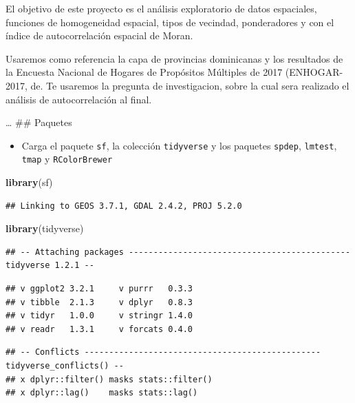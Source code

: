 \documentclass[11pt,]{article}
\newenvironment{Shaded}{\begin{snugshade}}{\end{snugshade}}
\newcommand{\KeywordTok}[1]{\textcolor[rgb]{0.13,0.29,0.53}{\textbf{#1}}}
\newcommand{\NormalTok}[1]{#1}
\providecommand{\tightlist}{%
\setlength{\itemsep}{0pt}\setlength{\parskip}{0pt}}
\begin{document}
El objetivo de este proyecto es el análisis exploratorio de datos
espaciales, funciones de homogeneidad espacial, tipos de vecindad,
ponderadores y con el índice de autocorrelación espacial de Moran.

Usaremos como referencia la capa de provincias dominicanas y los
resultados de la Encuesta Nacional de Hogares de Propósitos Múltiples de
2017 (ENHOGAR-2017, de. Te usaremos la pregunta de investigacion, sobre
la cual sera realizado el análisis de autocorrelación al final.

\ldots
\#\# Paquetes

\begin{itemize}
\tightlist
\item
  Carga el paquete \texttt{sf}, la colección \texttt{tidyverse} y los
  paquetes \texttt{spdep}, \texttt{lmtest}, \texttt{tmap} y
  \texttt{RColorBrewer}
\end{itemize}

\begin{Shaded}
\begin{Highlighting}[]
\KeywordTok{library}\NormalTok{(sf)}
\end{Highlighting}
\end{Shaded}

\begin{verbatim}
## Linking to GEOS 3.7.1, GDAL 2.4.2, PROJ 5.2.0
\end{verbatim}

\begin{Shaded}
\begin{Highlighting}[]
\KeywordTok{library}\NormalTok{(tidyverse)}
\end{Highlighting}
\end{Shaded}

\begin{verbatim}
## -- Attaching packages --------------------------------------------- tidyverse 1.2.1 --
\end{verbatim}

\begin{verbatim}
## v ggplot2 3.2.1     v purrr   0.3.3
## v tibble  2.1.3     v dplyr   0.8.3
## v tidyr   1.0.0     v stringr 1.4.0
## v readr   1.3.1     v forcats 0.4.0
\end{verbatim}

\begin{verbatim}
## -- Conflicts ------------------------------------------------ tidyverse_conflicts() --
## x dplyr::filter() masks stats::filter()
## x dplyr::lag()    masks stats::lag()
\end{verbatim}
\end{document}
